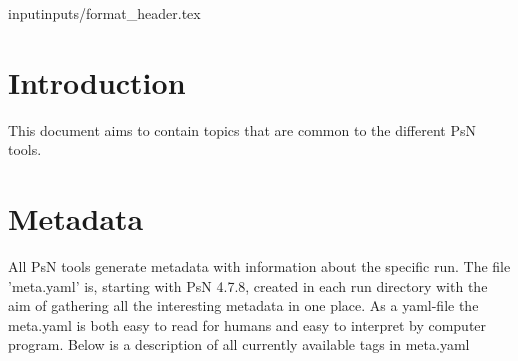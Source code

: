 input{inputs/format_header.tex}

\usepackage{tabularx}



	
	
	\maketitle
	\newcommand{\guidetoolname}{<toolname>}
	
	\section{Introduction}
	This document aims to contain topics that are common to the different PsN tools.
	
	\section{Metadata}
	All PsN tools generate metadata with information about the specific run. The file 'meta.yaml' is, starting with PsN 4.7.8, created in each run directory with the aim of gathering all the interesting metadata in one place. As a yaml-file the meta.yaml is both easy to read for humans and easy to interpret by computer program. Below is a description of all currently available tags in meta.yaml
	
